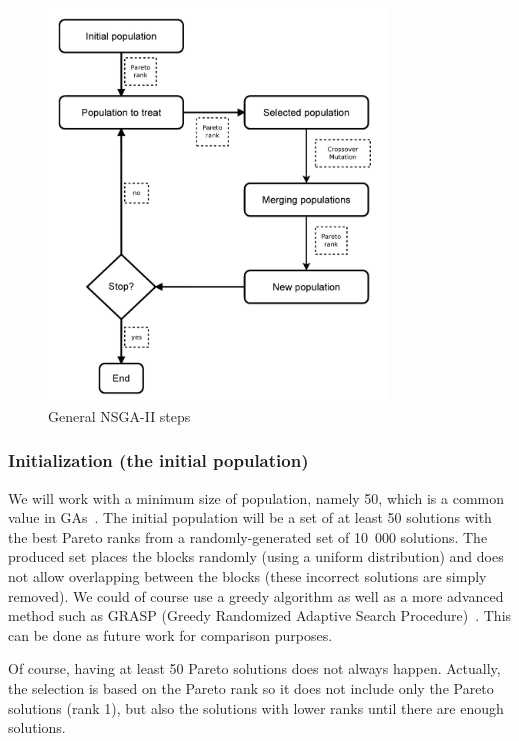 \begin{figure}[h!]
\begin{center}
\includegraphics[width=0.8\textwidth]{GA_dia_en.pdf}
\end{center}
\vspace{-0.5cm}
\caption{General NSGA-II steps}
\begin{center}
\end{center}
\label{fig:ga_steps}
\end{figure}

\subsubsection{Initialization (the initial population)}
We will work with a minimum size of population, namely 50, which is a common value in GAs~\cite{Davis1989}. The initial population will be a set of at least 50 solutions with the best Pareto ranks from a randomly-generated set of 10~000 solutions. The produced set places the blocks randomly (using a uniform distribution) and does not allow overlapping between the blocks (these incorrect solutions are simply removed). We could of course use a greedy algorithm as well as a more advanced method such as GRASP (Greedy Randomized Adaptive Search Procedure)~\cite{HarSho87a}. This can be done as future work for comparison purposes.

Of course, having at least 50 Pareto solutions does not always happen. Actually, the selection is based on the Pareto rank so it does not include only the Pareto solutions (rank 1), but also the solutions with lower ranks until there are enough solutions.

